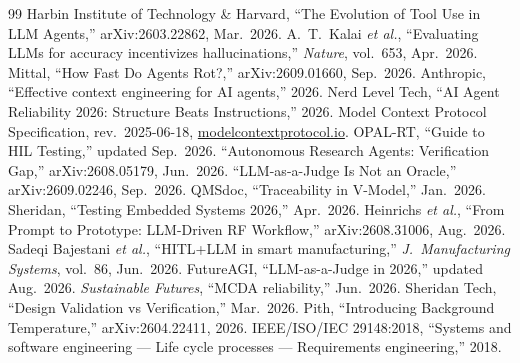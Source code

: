 \documentclass[11pt,a4paper]{article}
\begin{document}
\begin{thebibliography}{99}\small
{} Harbin Institute of Technology \& Harvard, ``The Evolution of Tool Use in LLM Agents,'' arXiv:2603.22862, Mar.\ 2026.
 A.\ T.\ Kalai \emph{et al.}, ``Evaluating LLMs for accuracy incentivizes hallucinations,'' \emph{Nature}, vol.\ 653, Apr.\ 2026.
 Mittal, ``How Fast Do Agents Rot?,'' arXiv:2609.01660, Sep.\ 2026.
 Anthropic, ``Effective context engineering for AI agents,'' 2026.
 Nerd Level Tech, ``AI Agent Reliability 2026: Structure Beats Instructions,'' 2026.
 Model Context Protocol Specification, rev.\ 2025-06-18, \url{modelcontextprotocol.io}.
 OPAL-RT, ``Guide to HIL Testing,'' updated Sep.\ 2026.
 ``Autonomous Research Agents: Verification Gap,'' arXiv:2608.05179, Jun.\ 2026.
 ``LLM-as-a-Judge Is Not an Oracle,'' arXiv:2609.02246, Sep.\ 2026.
 QMSdoc, ``Traceability in V-Model,'' Jan.\ 2026.
 Sheridan, ``Testing Embedded Systems 2026,'' Apr.\ 2026.
 Heinrichs \emph{et al.}, ``From Prompt to Prototype: LLM-Driven RF Workflow,'' arXiv:2608.31006, Aug.\ 2026.
 Sadeqi Bajestani \emph{et al.}, ``HITL+LLM in smart manufacturing,'' \emph{J.\ Manufacturing Systems}, vol.\ 86, Jun.\ 2026.
 FutureAGI, ``LLM-as-a-Judge in 2026,'' updated Aug.\ 2026.
 \emph{Sustainable Futures}, ``MCDA reliability,'' Jun.\ 2026.
 Sheridan Tech, ``Design Validation vs Verification,'' Mar.\ 2026.
 Pith, ``Introducing Background Temperature,'' arXiv:2604.22411, 2026.
 IEEE/ISO/IEC 29148:2018, ``Systems and software engineering --- Life cycle processes --- Requirements engineering,'' 2018.
\end{thebibliography}
\end{document}
